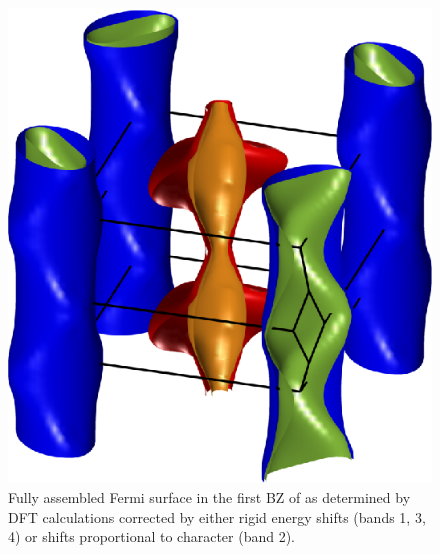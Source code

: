 \begin{figure}[htbp]
    \begin{center}
        \includegraphics[scale=0.7]{Chapter-dHvABaFe2P2/Figures/AngleDepMeasurements/BandCharacterFermiSurface/FullBandCharacterFermiSurface}
        \caption{Fully assembled Fermi surface in the first \ac{BZ} of \BaFeP{} as determined by \ac{DFT} calculations corrected by either rigid energy shifts (bands 1, 3, 4) or shifts proportional to \DzTwo{} character (band 2).}
        \label{Fig:ResD:FullBandCharacterFermiSurface}
    \end{center}
\end{figure}

